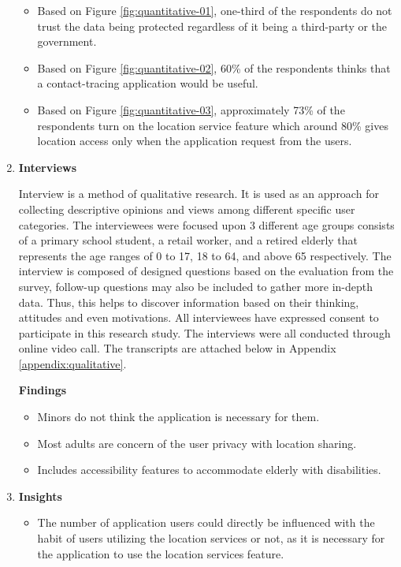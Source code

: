 \begin{enumerate}[1.]
            \begin{itemize}
              \item Based on Figure \ref{fig:quantitative-01}, one-third of the respondents do not trust the data being protected regardless of it being a third-party or the government.
              \item Based on Figure \ref{fig:quantitative-02}, 60\% of the respondents thinks that a contact-tracing application would be useful.
              \item Based on Figure \ref{fig:quantitative-03}, approximately 73\% of the respondents turn on the location service feature which around 80\% gives location access only when the application request from the users.
            \end{itemize}
        \item \textbf{Interviews}
          \par Interview is a method of qualitative research. It is used as an approach for collecting descriptive opinions and views among different specific user categories. The interviewees were focused upon 3 different age groups consists of a primary school student, a retail worker, and a retired elderly that represents the age ranges of 0 to 17, 18 to 64, and above 65 respectively. The interview is composed of designed questions based on the evaluation from the survey, follow-up questions may also be included to gather more in-depth data. Thus, this helps to discover information based on their thinking, attitudes and even motivations. All interviewees have expressed consent to participate in this research study. The interviews were all conducted through online video call. The transcripts are attached below in Appendix \ref{appendix:qualitative}.
          \par \textbf{Findings}
            \begin{itemize}
              \item Minors do not think the application is necessary for them.
              \item Most adults are concern of the user privacy with location sharing.
              \item Includes accessibility features to accommodate elderly with disabilities.
            \end{itemize}
        \item \textbf{Insights}
          \begin{itemize}
            \item The number of application users could directly be influenced with the habit of users utilizing the location services or not, as it is necessary for the application to use the location services feature.

\end{itemize}
\end{enumerate}
